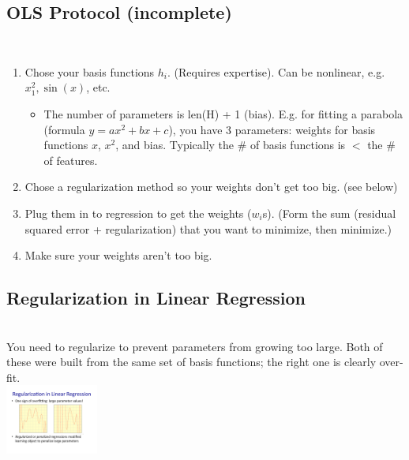 \subsection{OLS Protocol (incomplete)}  \hfill \\
\begin{enumerate}
	\item Chose your basis functions $h_i$.  (Requires expertise).  Can be nonlinear, e.g. $x_1^2, \sin(x)$, etc. 
		\begin {itemize}
			\item 
				The number of parameters is len(H) + 1 (bias).  
				E.g. for fitting a parabola (formula $y = ax^2 + bx + c$), 
				you have 3 parameters: weights for basis functions $x$, $x^2$, and bias. 
				Typically the \# of basis functions is $<$ the \# of features.
		\end {itemize}
	\item Chose a regularization method so your weights don't get too big.  (see below)
	\item Plug them in to regression to get the weights ($w_i$s).  (Form the sum (residual squared error + regularization) that you want to minimize, then minimize.)    
	\item Make sure your weights aren't too big. 
	
\end{enumerate}

\subsection{Regularization in Linear Regression}  \hfill \\
You need to regularize to prevent parameters from growing too large.  
Both of these were built from the same set of basis functions; the right one is clearly over-fit. \hfill \\
\includegraphics[width=1.2in]{figures/need_to_regularize.pdf}

